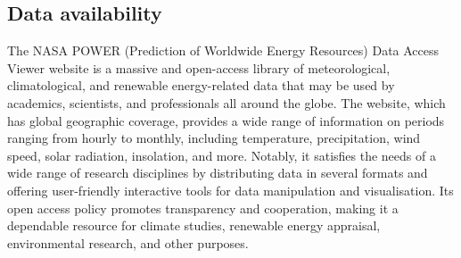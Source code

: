 \subsection*{Data availability}
The NASA POWER (Prediction of Worldwide Energy Resources) Data Access Viewer website is a massive and open-access library of meteorological, climatological, and renewable energy-related data that may be used by academics, scientists, and professionals all around the globe. The website, which has global geographic coverage, provides a wide range of information on periods ranging from hourly to monthly, including temperature, precipitation, wind speed, solar radiation, insolation, and more. Notably, it satisfies the needs of a wide range of research disciplines by distributing data in several formats and offering user-friendly interactive tools for data manipulation and visualisation. Its open access policy promotes transparency and cooperation, making it a dependable resource for climate studies, renewable energy appraisal, environmental research, and other purposes.
